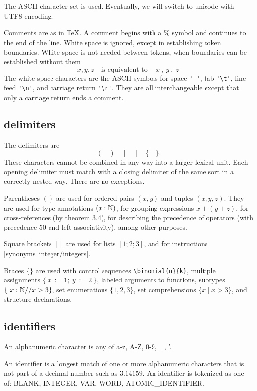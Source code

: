 \documentclass[12pt]{article}
\numberwithin{definition}{section}
\begin{document}
The ASCII character set is used. Eventually, we will switch to unicode with
UTF8 encoding.

Comments are as in \TeX.  A comment begins with a \% symbol and continues to the
end of the line.  White space is ignored, except in establishing token boundaries.
White space is not needed between tokens, when boundaries can be established
without them
\[
{x,y,z} \quad\text{is equivalent to}\quad {\ x\ ,\ y\ ,\ z\ }
\]
The white space characters are the ASCII symbols for
space \verb!' '!, tab \verb!'\t'!, line feed \verb!'\n'!, and carriage return \verb!'\r'!.  
They are all interchangeable except
that only a carriage return ends a comment.

\subsection{delimiters}
The delimiters are
\[
(\quad )\quad [\quad ]\quad \{\quad \}.
\]
These characters cannot be combined in any way into a larger lexical unit.
Each opening delimiter must match with a closing delimiter of the same sort
in a correctly nested way.  There are no exceptions.

Parentheses $()$ are used for ordered pairs $(x,y)$ and tuples $(x,y,z)$.
They are used for type annotations $(x : {\mathbb N})$, for grouping
expressions $x + (y+z)$, for cross-references (by theorem 3.4), for
describing the precedence of operators (with precedence 50 and left
associativity), among other purposes.

Square brackets $[]$ are used for lists $[1;2;3]$, and for instructions
[synonyms~integer/integers].

Braces $\{\}$ are used with control sequences \verb!\binomial{n}{k}!, multiple assignments
$\{\ x\ := 1;\ y\ := 2\ \}$, labeled arguments to functions, subtypes
$\{\ x : \Nat \tmid x > 3\}$, set enumerations $\{1,2,3\}$, set
comprehensions $\{x \mid x > 3\}$, and structure declarations.

\subsection{identifiers}

An alphanumeric character is any of a-z, A-Z, 0-9, \_, '.  

An identifier is a longest match of one or more alphanumeric
characters that is not part of a decimal number such as $3.14159$.
An identifier is tokenized as one of: BLANK, INTEGER, VAR,
WORD, ATOMIC\_IDENTIFIER.
\end{document}
